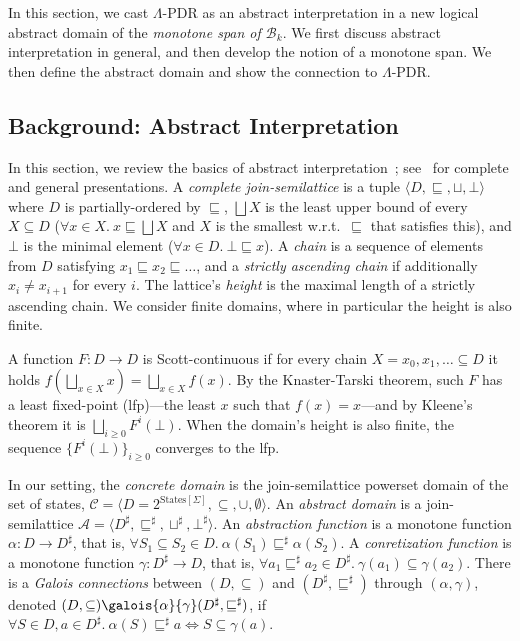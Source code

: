 \documentclass[acmsmall,screen]{acmart}
\newcommand{\vocabulary}{\Sigma}
\newcommand{\voc}{\vocabulary}
\newcommand{\States}{{\mbox{States}}[\voc]}
\newcommand{\set}[1]{\{{#1}\}}
\newcommand{\bkwrch}[1]{\mathcal{B}_{#1}}
\newcommand{\sleq}{\sqsubseteq}
\newcommand{\abs}[1]{{#1}^{\sharp}}
\newcommand{\join}{\mathbin{\sqcup}}
\newcommand{\bigjoin}{\bigsqcup}
\begin{document}
In this section, we cast $\Lambda$-PDR as an abstract interpretation in a new logical abstract domain of the \emph{monotone span of $\bkwrch{k}$}.
%
We first discuss abstract interpretation in general, and then develop the notion of a monotone span. We then define the abstract domain and show the connection to $\Lambda$-PDR.

\subsection{Background: Abstract Interpretation}
\label{sec:ai-background}
In this section, we review the basics of abstract interpretation~\cite{DBLP:conf/popl/CousotC77}; see~\cite{urban2015static,rival2020introduction} for complete and general presentations.
A \emph{complete join-semilattice} is a tuple $\langle D, \sleq, \join, \bot \rangle$ where $D$ is partially-ordered by $\sleq$, $\bigjoin X$ is the least upper bound of every $X \subseteq D$ ($\forall x \in X. \ x \sleq \bigjoin X$ and $X$ is the smallest w.r.t.\ $\sleq$ that satisfies this), and $\bot$ is the minimal element ($\forall x \in D. \ \bot \sleq x$).
%
%
A \emph{chain} is a sequence of elements from $D$ satisfying $x_1 \sleq x_2 \sleq \ldots$, and a \emph{strictly ascending chain} if additionally $x_i \neq x_{i+1}$ for every $i$. The lattice's \emph{height} is the maximal length of a strictly ascending chain.
We consider finite domains, where in particular the height is also finite.

%
%
%
A function $F: D \to D$ is Scott-continuous if for every chain $X=x_0,x_1,\ldots \subseteq D$ it holds $f(\bigjoin_{x \in X} x) = \bigjoin_{x \in X}{f(x)}$.
By the Knaster-Tarski theorem, such $F$ has a least fixed-point (lfp)---the least $x$ such that $f(x)=x$---and by Kleene's theorem it is $\bigjoin_{i \geq 0}{F^i(\bot)}$. When %
the domain's height is also finite, the sequence $\set{F^i(\bot)}_{i \geq 0}$ converges to the lfp.

%
In our setting, the \emph{concrete domain} is the join-semilattice powerset domain of the set of states, $\mathcal{C} = \langle D=2^{\States}, \subseteq, \cup, \emptyset \rangle$.
An \emph{abstract domain} is a join-semilattice $\mathcal{A} = \langle \abs{D}, \abs{\sleq}, \abs{\join}, \abs{\bot} \rangle$.
An \emph{abstraction function} is a monotone function $\alpha: D \to \abs{D}$, that is, $\forall S_1 \subseteq S_2 \in D. \ \alpha(S_1) \abs{\sleq} \alpha(S_2)$.
A \emph{conretization function} is a monotone function $\gamma: \abs{D} \to D$, that is, $\forall a_1 \abs{\sleq} a_2 \in \abs{D}. \ \gamma(a_1) \subseteq \gamma(a_2)$.
There is a \emph{Galois connections} between $(D, \subseteq)$ and $(\abs{D}, \abs{\sleq})$ through $(\alpha,\gamma)$, denoted $(D, \subseteq) \galois{\alpha}{\gamma} (\abs{D}, \abs{\sleq})$, if $\forall S \in D, a \in \abs{D}. \ \alpha(S) \abs{\sleq} a \Leftrightarrow S \subseteq \gamma(a)$.
%
\end{document}
